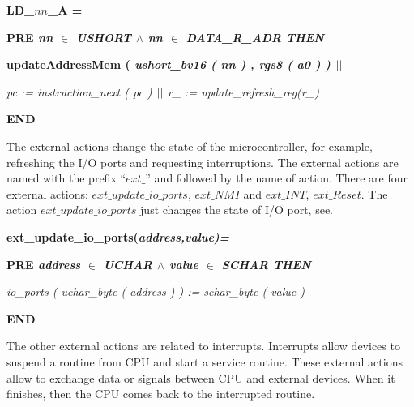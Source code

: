 \documentclass[a4paper]{llncs}
\begin{document}
\bf LD\_\(nn\)\_A  \rm =

\hspace*{0.20in}\bf PRE \it nn $\in$ \it USHORT\hspace*{0.15in} $\land$ \hspace*{0.10in}\it nn\hspace*{0.10in} $\in$  \it DATA\_R\_ADR \hspace*{0.10in}\bf THEN

\hspace*{0.20in}\bf updateAddressMem \rm ( \it ushort\_bv16 \rm ( \it nn \rm ) \rm , \it rgs8 \rm ( \it a0 \rm )
\rm )  $\mbox{$\mid\mid$}$

\hspace*{0.20in}\it pc \rm := \it instruction\_next \rm ( \it pc \rm )  $\mbox{$\mid\mid$}$  \it r\_ \rm := \it update\_refresh\_reg\rm (\it r\_\rm )

\hspace*{0.00in}\bf END\rm 

The external actions change the state of the microcontroller, for
example, refreshing the I/O ports and requesting interruptions. The
external actions are named with the prefix ``$ext\_$'' and followed by
the name of action. There are four external actions: $ext\_update\_io\_ports$, $ext\_NMI$ and
$ext\_INT$, $ext\_Reset$. The action $ext\_update\_io\_ports$
just changes the state of I/O port,  see. 

\hspace*{0.00in}\bf ext\_update\_io\_ports\rm (\it address\rm ,\it value\rm )\rm =

\hspace*{0.20in}\bf PRE \it address  $\in$  \it UCHAR  $\land$ \hspace*{0.10in}\it value  $\in$  \it SCHAR \bf THEN

\hspace*{0.20in}\it io\_ports \rm ( \it uchar\_byte \rm ( \it address \rm ) \rm ) \rm := \it schar\_byte \rm ( \it
value \rm )

\hspace*{0.00in}\bf END\rm

The other external actions are related to interrupts. Interrupts allow
devices to suspend a routine from CPU and start a service routine.
These external actions allow to exchange data or signals between CPU and external
devices. When it finishes, then the CPU comes back to the interrupted
routine. 
\end{document}
